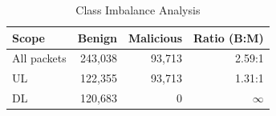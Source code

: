\begin{table}[htbp]
\centering
\caption{Class Imbalance Analysis}\label{tab:imbalance}
\begin{tabular}{lrrr}
\toprule
\textbf{Scope} & \textbf{Benign} & \textbf{Malicious} & \textbf{Ratio (B:M)} \\
\midrule
All packets & 243,038 & 93,713 & 2.59:1 \\
UL & 122,355 & 93,713 & 1.31:1 \\
DL & 120,683 & 0 & $\infty$ \\
\bottomrule
\end{tabular}
\end{table}
